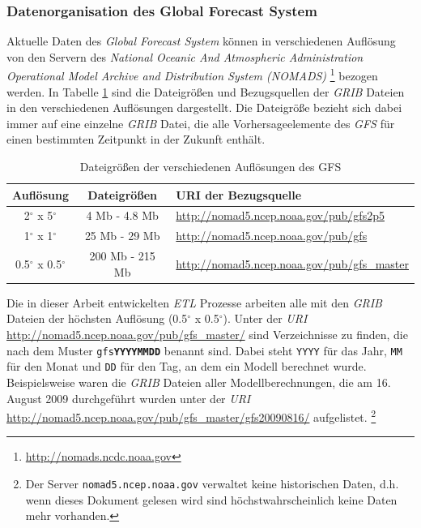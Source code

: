 \subsubsection{Datenorganisation des Global Forecast System}

Aktuelle Daten des \textit{Global Forecast System} können in
verschiedenen Auflösung von den Servern des \textit{National Oceanic
  And Atmospheric Administration Operational Model Archive and
  Distribution System (NOMADS)} 
\footnote{\url{http://nomads.ncdc.noaa.gov}} bezogen werden. In
Tabelle \ref{tab:gfs_auflösungen} sind die Dateigrößen und
Bezugsquellen der \textit{GRIB} Dateien in den verschiedenen
Auflösungen dargestellt. Die Dateigröße bezieht sich dabei immer auf
eine einzelne \textit{GRIB} Datei, die alle Vorhersageelemente des
\textit{GFS} für einen bestimmten Zeitpunkt in der Zukunft enthält.

\begin{table}[h]
  \centering
  {\sf
    \footnotesize
    \begin{longtable}{@{}ccl}

      \toprule
      \textbf{Auflösung} & \textbf{Dateigrößen} & \textbf{URI der Bezugsquelle} \\

      \midrule

      2$^{\circ}$ x 5$^{\circ}$ & 4 Mb - 4.8 Mb & \url{http://nomad5.ncep.noaa.gov/pub/gfs2p5} \\
      1$^{\circ}$ x 1$^{\circ}$ & 25 Mb - 29 Mb & \url{http://nomad5.ncep.noaa.gov/pub/gfs} \\
      0.5$^{\circ}$ x 0.5$^{\circ}$ & 200 Mb - 215 Mb & \url{http://nomad5.ncep.noaa.gov/pub/gfs_master} \\

      \bottomrule

    \end{longtable}
  }

  \caption{Dateigrößen der verschiedenen Auflösungen des GFS}
  \label{tab:gfs_auflösungen}

\end{table}

Die in dieser Arbeit entwickelten \textit{ETL} Prozesse arbeiten alle
mit den \textit{GRIB} Dateien der höchsten Auflösung
(0.5$^{\circ}$ x 0.5$^{\circ}$). Unter der \textit{URI}
\url{http://nomad5.ncep.noaa.gov/pub/gfs_master/} sind Verzeichnisse
zu finden, die nach dem Muster \texttt{gfs\textbf{YYYYMMDD}} benannt
sind. Dabei steht \texttt{YYYY} für das Jahr, \texttt{MM} für den
Monat und \texttt{DD} für den Tag, an dem ein Modell berechnet
wurde. Beispielsweise waren die \textit{GRIB} Dateien aller
Modellberechnungen, die am 16. August 2009 durchgeführt wurden unter
der \textit{URI}
\url{http://nomad5.ncep.noaa.gov/pub/gfs_master/gfs20090816/}
aufgelistet.  \footnote{Der Server \texttt{nomad5.ncep.noaa.gov}
  verwaltet keine historischen Daten, d.h. wenn dieses Dokument
  gelesen wird sind höchstwahrscheinlich keine Daten mehr vorhanden.}

